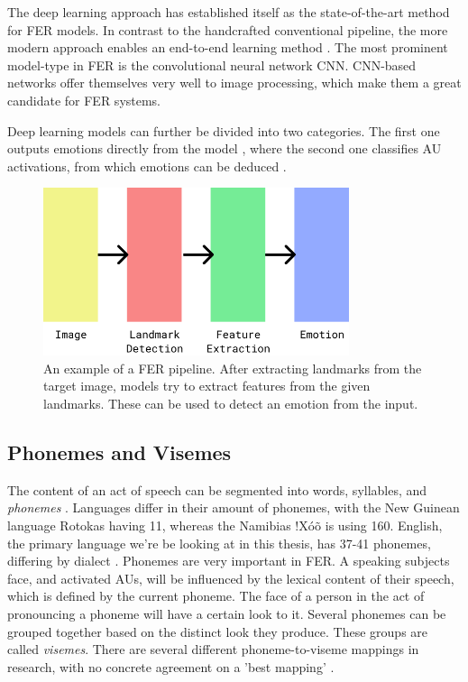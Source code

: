 The deep learning approach has established itself as the state-of-the-art method for FER models. In contrast to the handcrafted conventional pipeline, the more modern approach enables an end-to-end learning method \cite{ko2018brief}. The most prominent model-type in FER is the convolutional neural network CNN. CNN-based networks offer themselves very well to image processing, which make them a great candidate for FER systems. 

Deep learning models can further be divided into two categories. The first one outputs emotions directly from the model \cite{ebrahimi2015recurrent} \cite{kim2017multi} \cite{jung2015joint}, where the second one classifies AU activations, from which emotions can be deduced \cite{breuer2017deep} \cite{zhao2016deep} \cite{chu2017learning}. 

\begin{figure}
    \centering
    \includegraphics[width=0.8\textwidth]{res/png_backup/mfa.png}
    \caption{An example of a FER pipeline. After extracting landmarks from the target image, models try to extract features from the given landmarks. These can be used to detect an emotion from the input.}
    \label{fig:pipeline_fer}
\end{figure}

\subsection{Phonemes and Visemes}
The content of an act of speech can be segmented into words, syllables, and \emph{phonemes} \cite{savin1970nonperceptual}. Languages differ in their amount of phonemes, with the New Guinean language Rotokas having 11, whereas the Namibias !Xóõ is using 160. English, the primary language we're be looking at in this thesis, has 37-41 phonemes, differing by dialect \cite{Hayes2009}. Phonemes are very important in FER. A speaking subjects face, and activated AUs, will be influenced by the lexical content of their speech, which is defined by the current phoneme. The face of a person in the act of pronouncing a phoneme will have a certain look to it. Several phonemes can be grouped together based on the distinct look they produce. These groups are called \emph{visemes}. There are several different phoneme-to-viseme mappings in research, with no concrete agreement on a 'best mapping' \cite{cappelletta2012viseme}.

